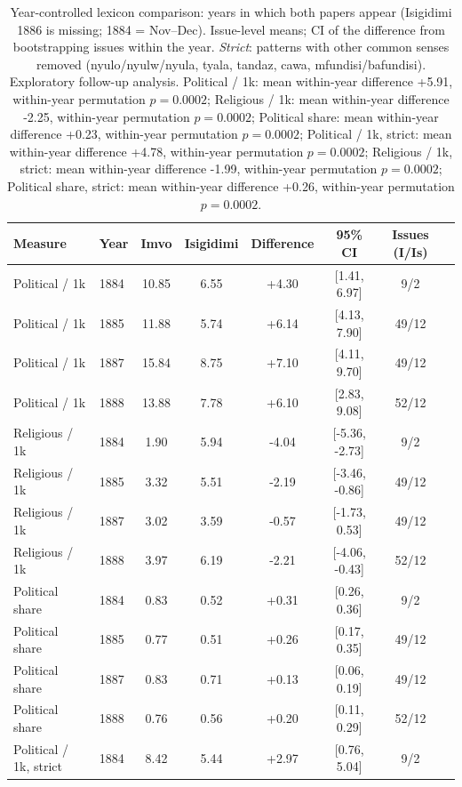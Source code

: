 \begin{table}[h]\centering\small\caption{Year-controlled lexicon comparison: years in which both papers appear (Isigidimi 1886 is missing; 1884 = Nov--Dec). Issue-level means; CI of the difference from bootstrapping issues within the year. \emph{Strict}: patterns with other common senses removed (nyulo/nyulw/nyula, tyala, tandaz, cawa, mfundisi/bafundisi). Exploratory follow-up analysis. Political / 1k: mean within-year difference +5.91, within-year permutation $p=0.0002$; Religious / 1k: mean within-year difference -2.25, within-year permutation $p=0.0002$; Political share: mean within-year difference +0.23, within-year permutation $p=0.0002$; Political / 1k, strict: mean within-year difference +4.78, within-year permutation $p=0.0002$; Religious / 1k, strict: mean within-year difference -1.99, within-year permutation $p=0.0002$; Political share, strict: mean within-year difference +0.26, within-year permutation $p=0.0002$.}
\begin{tabular}{@{}llcccccc@{}}\toprule Measure & Year & Imvo & Isigidimi & Difference & 95\% CI & Issues (I/Is) \\ \midrule
Political / 1k & 1884 & 10.85 & 6.55 & +4.30 & [1.41, 6.97] & 9/2 \\
Political / 1k & 1885 & 11.88 & 5.74 & +6.14 & [4.13, 7.90] & 49/12 \\
Political / 1k & 1887 & 15.84 & 8.75 & +7.10 & [4.11, 9.70] & 49/12 \\
Political / 1k & 1888 & 13.88 & 7.78 & +6.10 & [2.83, 9.08] & 52/12 \\
Religious / 1k & 1884 & 1.90 & 5.94 & -4.04 & [-5.36, -2.73] & 9/2 \\
Religious / 1k & 1885 & 3.32 & 5.51 & -2.19 & [-3.46, -0.86] & 49/12 \\
Religious / 1k & 1887 & 3.02 & 3.59 & -0.57 & [-1.73, 0.53] & 49/12 \\
Religious / 1k & 1888 & 3.97 & 6.19 & -2.21 & [-4.06, -0.43] & 52/12 \\
Political share & 1884 & 0.83 & 0.52 & +0.31 & [0.26, 0.36] & 9/2 \\
Political share & 1885 & 0.77 & 0.51 & +0.26 & [0.17, 0.35] & 49/12 \\
Political share & 1887 & 0.83 & 0.71 & +0.13 & [0.06, 0.19] & 49/12 \\
Political share & 1888 & 0.76 & 0.56 & +0.20 & [0.11, 0.29] & 52/12 \\
Political / 1k, strict & 1884 & 8.42 & 5.44 & +2.97 & [0.76, 5.04] & 9/2 \\

\end{tabular}
\end{table}
